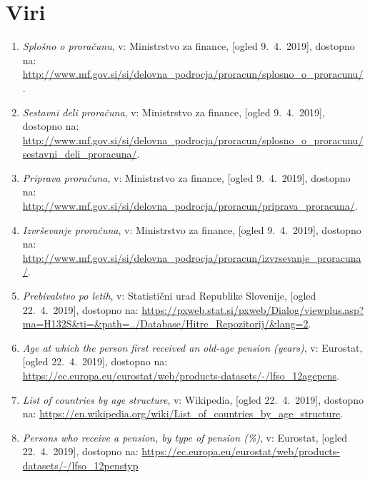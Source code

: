 \documentclass[12pt, a4paper]{article}
\begin{document}
\newpage

\section[Viri]{Viri}
\begin{enumerate}
\item
\label{Splošno o proračunu}
\emph{Splošno o proračunu}, v: Ministrstvo za finance, [ogled 9.~4.~2019], dostopno na: \url{http://www.mf.gov.si/si/delovna_podrocja/proracun/splosno_o_proracunu/}.

\item
\label{Sestavni deli}
\emph{Sestavni deli proračuna}, v: Ministrstvo za finance, [ogled 9.~4.~2019], dostopno na: \url{http://www.mf.gov.si/si/delovna_podrocja/proracun/splosno_o_proracunu/sestavni_deli_proracuna/}.

\item
\label{Priprava proračuna}
\emph{Priprava proračuna}, v: Ministrstvo za finance, [ogled 9.~4.~2019], dostopno na: \url{http://www.mf.gov.si/si/delovna_podrocja/proracun/priprava_proracuna/}.

\item
\label{Izvrševanje proračuna}
\emph{Izvrševanje proračuna}, v: Ministrstvo za finance, [ogled 9.~4.~2019], dostopno na: \url{http://www.mf.gov.si/si/delovna_podrocja/proracun/izvrsevanje_proracuna/}.

\item
\label{Prebivalstvo Slovenije}
\emph{Prebivalstvo po letih}, v: Statistični urad Republike Slovenije, [ogled 22.~4.~2019], dostopno na: \url{https://pxweb.stat.si/pxweb/Dialog/viewplus.asp?ma=H132S&ti=&path=../Database/Hitre_Repozitorij/&lang=2}.

\item
\label{Eurostat pokojnine}
\emph{Age at which the person first received an old-age pension (years)}, v: Eurostat, [ogled 22.~4.~2019], dostopno na: \url{https://ec.europa.eu/eurostat/web/products-datasets/-/lfso_12agepens}.

\item
\label{Struktura prebivalstva}
\emph{List of countries by age structure}, v: Wikipedia, [ogled 22.~4.~2019], dostopno na: \url{https://en.wikipedia.org/wiki/List_of_countries_by_age_structure}.

\item
\label{Eurostat pokojnine procentualno}
\emph{Persons who receive a pension, by type of pension (\%)}, v: Eurostat, [ogled 22.~4.~2019], dostopno na: \url{https://ec.europa.eu/eurostat/web/products-datasets/-/lfso_12penstyp}


\end{enumerate}
\end{document}
